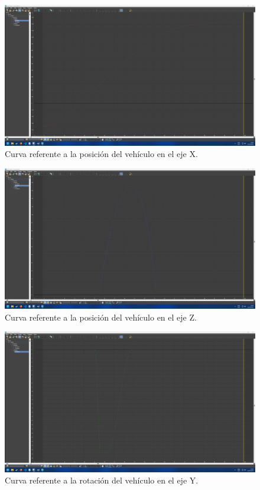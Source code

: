 \documentclass{article}
\begin{document}
\begin{figure}[H]
    \centering
    \includegraphics[width=\textwidth]{imagenes/Ejercicio2/curvas/red.png}
    \caption{Curva referente a la posición del vehículo en el eje X.}
 \end{figure}
 \begin{figure}[H]
    \centering
    \includegraphics[width=\textwidth]{imagenes/Ejercicio2/curvas/blue.png}
    \caption{Curva referente a la posición del vehículo en el eje Z.}
 \end{figure}
 \begin{figure}[H]
    \centering
    \includegraphics[width=\textwidth]{imagenes/Ejercicio2/curvas/green.png}
    \caption{Curva referente a la rotación del vehículo en el eje Y.}
 \end{figure}
\end{document}
